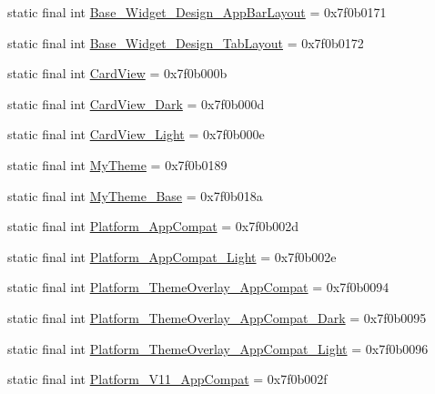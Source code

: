 \begin{CompactItemize}
\item 
static final int \hyperlink{classandroid_1_1support_1_1v7_1_1appcompat_1_1_r_1_1style_2b19e8eb7c6d843cffc405bd4e402b86}{Base\_\-Widget\_\-Design\_\-AppBarLayout} = 0x7f0b0171
\item 
static final int \hyperlink{classandroid_1_1support_1_1v7_1_1appcompat_1_1_r_1_1style_64794dc12ff39404d2da482238f1b1df}{Base\_\-Widget\_\-Design\_\-TabLayout} = 0x7f0b0172
\item 
static final int \hyperlink{classandroid_1_1support_1_1v7_1_1appcompat_1_1_r_1_1style_6f19b484b7b0932c2003561d05eb8ba9}{CardView} = 0x7f0b000b
\item 
static final int \hyperlink{classandroid_1_1support_1_1v7_1_1appcompat_1_1_r_1_1style_22290d35891763becc47e72445b88192}{CardView\_\-Dark} = 0x7f0b000d
\item 
static final int \hyperlink{classandroid_1_1support_1_1v7_1_1appcompat_1_1_r_1_1style_e2edfb28aeeea5788279ce24cdf0197e}{CardView\_\-Light} = 0x7f0b000e
\item 
static final int \hyperlink{classandroid_1_1support_1_1v7_1_1appcompat_1_1_r_1_1style_3e9ac9d0274c7652e8cb9244e07222d6}{MyTheme} = 0x7f0b0189
\item 
static final int \hyperlink{classandroid_1_1support_1_1v7_1_1appcompat_1_1_r_1_1style_4d006cd4edc1493b17b1f94818a46bdb}{MyTheme\_\-Base} = 0x7f0b018a
\item 
static final int \hyperlink{classandroid_1_1support_1_1v7_1_1appcompat_1_1_r_1_1style_b58a05db80ea105b5554605910a13d76}{Platform\_\-AppCompat} = 0x7f0b002d
\item 
static final int \hyperlink{classandroid_1_1support_1_1v7_1_1appcompat_1_1_r_1_1style_477080231454c68e6fd2d64e34a643c2}{Platform\_\-AppCompat\_\-Light} = 0x7f0b002e
\item 
static final int \hyperlink{classandroid_1_1support_1_1v7_1_1appcompat_1_1_r_1_1style_af61faea5ef45c3ab56a1d5d10de0cfa}{Platform\_\-ThemeOverlay\_\-AppCompat} = 0x7f0b0094
\item 
static final int \hyperlink{classandroid_1_1support_1_1v7_1_1appcompat_1_1_r_1_1style_535d52a29136639f8eb82959f6f46d13}{Platform\_\-ThemeOverlay\_\-AppCompat\_\-Dark} = 0x7f0b0095
\item 
static final int \hyperlink{classandroid_1_1support_1_1v7_1_1appcompat_1_1_r_1_1style_74c4013887e45105196ff5257126f874}{Platform\_\-ThemeOverlay\_\-AppCompat\_\-Light} = 0x7f0b0096
\item 
static final int \hyperlink{classandroid_1_1support_1_1v7_1_1appcompat_1_1_r_1_1style_4cb325ea2252221e9b4eabd11c9b24bf}{Platform\_\-V11\_\-AppCompat} = 0x7f0b002f

\end{CompactItemize}
